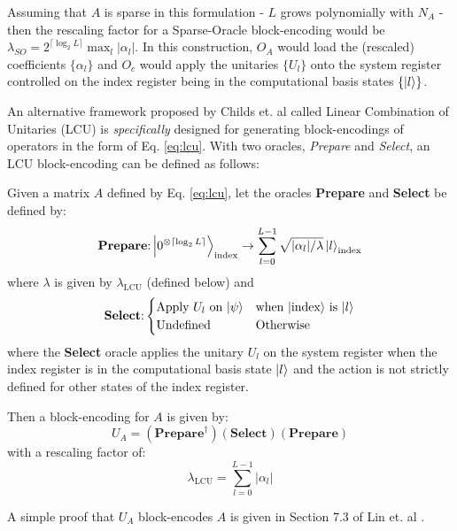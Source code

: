 Assuming that $A$ is sparse in this formulation - $L$ grows polynomially with $N_A$ - then the rescaling factor for a Sparse-Oracle block-encoding would be $\lambda_{SO} = 2^{\lceil \log_2 L \rceil} \max_{l} |\alpha_l|$.
In this construction, $O_A$ would load the (rescaled) coefficients $\{\alpha_l\}$ and $O_c$ would apply the unitaries $\{U_l\}$ onto the system register controlled on the index register being in the computational basis states $\{\ket{l}\}$. 

An alternative framework proposed by Childs et. al \cite{childs2012hamiltonian} called Linear Combination of Unitaries (LCU) is \textit{specifically} designed for generating block-encodings of operators in the form of Eq. \ref{eq:lcu}. 
With two oracles, \textit{Prepare} and \textit{Select}, an LCU block-encoding can be defined as follows:
\begin{theorem}
    \label{th:lcu}
    Given a matrix $A$ defined by Eq. \ref{eq:lcu}, let the oracles \textbf{Prepare} and \textbf{Select} be defined by:
    \begin{equation}
        \label{eq:prep-state}
        \textbf{Prepare}\text{:} \ket{0^{\otimes \lceil \log_2 L \rceil}}_\text{index} \rightarrow \sum_{l=0}^{L-1} \sqrt{| \alpha_l | / \lambda} \ket{l}_\text{index}
    \end{equation}
    where $\lambda$ is given by $\lambda_\text{LCU}$ (defined below) and
    \begin{equation}
        \label{eq:select}
        \textbf{Select}\text{:} 
        \begin{cases} 
            \text{Apply $U_l$ on $\ket{\psi}$} & \text{when $\ket{\text{index}}$ is $\ket{l}$} \\
            \text{Undefined} & \text{Otherwise} \\
        \end{cases}
    \end{equation}
    where the \textbf{Select} oracle applies the unitary $U_l$ on the system register when the index register is in the computational basis state $\ket{l}$ and the action is not strictly defined for other states of the index register.

    Then a block-encoding for $A$ is given by:
    \begin{equation}
        \label{eq:lcu-be}
        U_A = (\textbf{Prepare}^\dagger) (\textbf{Select}) (\textbf{Prepare})
    \end{equation}
    with a rescaling factor of:
    \begin{equation}
        \lambda_\text{LCU} = \sum_{l=0}^{L-1} | \alpha_l |
    \end{equation}
\end{theorem}
A simple proof that $U_A$ block-encodes $A$ is given in Section 7.3 of Lin et. al \cite{lin2022lecture}.

